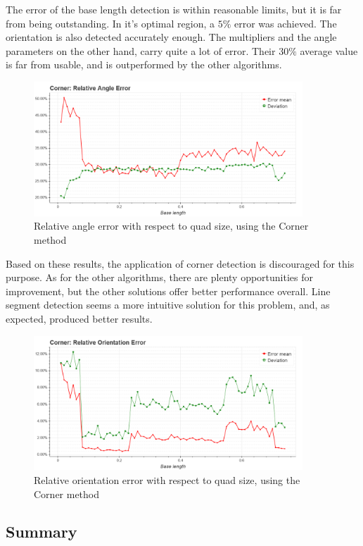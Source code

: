 The error of the base length detection is within reasonable limits, but it is far from being outstanding.
In it's optimal region, a $5\%$ error was achieved.
The orientation is also detected accurately enough.
The multipliers and the angle parameters on the other hand, carry quite a lot of error.
Their $30\%$ average value is far from usable, and is outperformed by the other algorithms.
\begin{figure}[ht]
	\centering
	\includegraphics[width=0.9\textwidth]{figures/plots/corner_relative_angle_error.png}
	\caption{Relative angle error with respect to quad size, using the Corner method}
	\label{fig:cornerRelAngleErr}
\end{figure}

Based on these results, the application of corner detection is discouraged for this purpose.
As for the other algorithms, there are plenty opportunities for improvement, but the other solutions offer better performance overall.
Line segment detection seems a more intuitive solution for this problem, and, as expected, produced better results.
\begin{figure}[ht]
	\centering
	\includegraphics[width=0.9\textwidth]{figures/plots/corner_relative_orientation_error.png}
	\caption{Relative orientation error with respect to quad size, using the Corner method}
	\label{fig:cornerRelOrientErr}
\end{figure}

\clearpage

\subsection{Summary}
